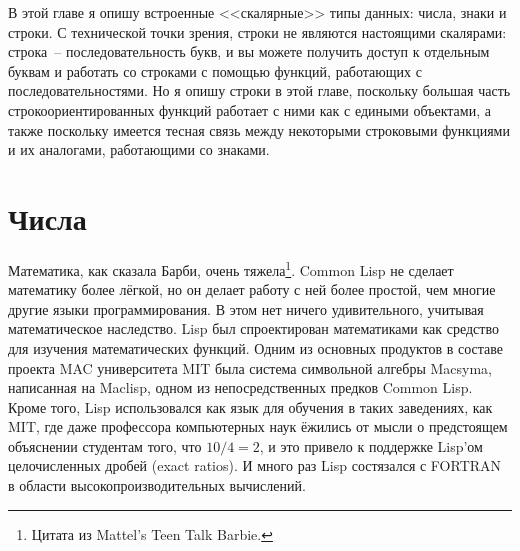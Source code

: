В этой главе я опишу встроенные <<скалярные>> типы данных: числа, знаки и строки.  С
технической точки зрения, строки не являются настоящими скалярами: строка~--
последовательность букв, и вы можете получить доступ к отдельным буквам и работать со
строками с помощью функций, работающих с последовательностями.  Но я опишу строки в этой
главе, поскольку большая часть строкоориентированных функций работает с ними как с
едиными объектами, а также поскольку имеется тесная связь между некоторыми строковыми
функциями и их аналогами, работающими со знаками.

\section{Числа}

Математика, как сказала Барби, очень тяжела\footnote{Цитата из Mattel's Teen Talk Barbie.}.
Common Lisp не сделает математику более лёгкой, но он делает работу с ней более простой,
чем многие другие языки программирования.  В этом нет ничего удивительного, учитывая
математическое наследство.  Lisp был спроектирован математиками как средство для изучения
математических функций.  Одним из основных продуктов в составе проекта MAC университета
MIT была система символьной алгебры Macsyma, написанная на Maclisp, одном из
непосредственных предков Common Lisp.  Кроме того, Lisp использовался как язык для
обучения в таких заведениях, как MIT, где даже профессора компьютерных наук ёжились от
мысли о предстоящем объяснении студентам того, что $10/4 = 2$, и это привело к поддержке
Lisp'ом целочисленных дробей (exact ratios).  И много раз Lisp состязался с FORTRAN в
области высокопроизводительных вычислений.

